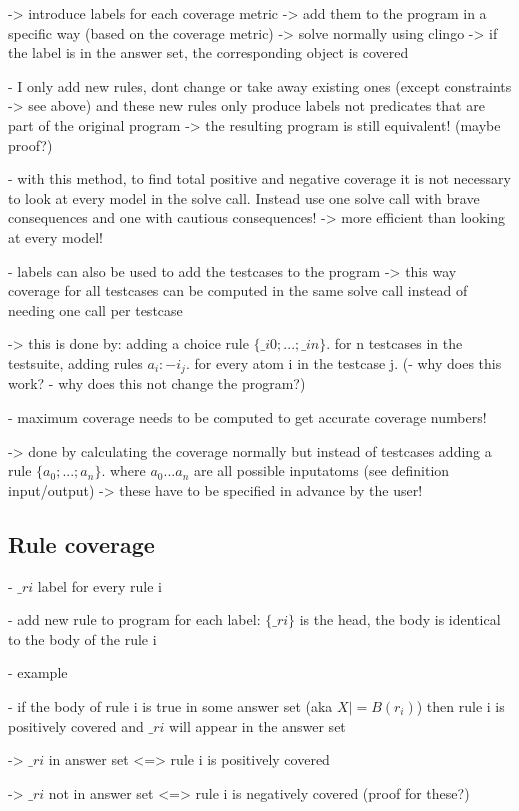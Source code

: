 -> introduce labels for each coverage metric -> add them to the program in a specific way (based on the coverage metric)  -> solve 
normally using clingo -> if the label is in the answer set, the corresponding object is covered

- I only add new rules, dont change or take away existing ones (except constraints -> see above) and these new rules only produce 
labels not predicates that are part of the original program -> the resulting program is still equivalent! (maybe proof?)

- with this method, to find total positive and negative coverage it is not necessary to look at every model in the solve call. 
Instead use one solve call with brave consequences and one with cautious consequences! -> more efficient than looking at every model!

- labels can also be used to add the testcases to the program -> this way coverage for all testcases can be computed in the same solve 
call instead of needing one call per testcase

-> this is done by: adding a choice rule $\{\_i0;...;\_in\}$. for n testcases in the testsuite, adding rules $a_i :- i_j$. for every atom i 
in the testcase j.
(- why does this work?
- why does this not change the program?)

- maximum coverage needs to be computed to get accurate coverage numbers!

-> done by calculating the coverage normally but instead of testcases adding a rule $\{a_0;...;a_n\}$. where $a_0...a_n$ are all possible 
inputatoms (see definition input/output) -> these have to be specified in advance by the user!

\subsection{Rule coverage}
\label{subsec:Computing coverage metrics for propositional programs/General approach/Rule coverage}
- $\_ri$ label for every rule i

- add new rule to program for each label: $\{\_ri\}$ is the head, the body is identical to the body of the rule i

- example

- if the body of rule i is true in some answer set (aka $X |= B(r_i)$) then rule i is positively covered and $\_ri$ will appear in the answer set 

-> $\_ri$ in answer set <=> rule i is positively covered

-> $\_ri$ not in answer set <=> rule i is negatively covered (proof for these?)

